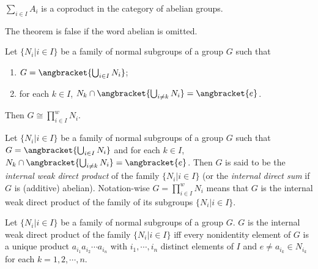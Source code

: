 \begin{theorem}
	$ \sum_{i \in I}A_i $ is a coproduct in the category of abelian groups.
\end{theorem}
The theorem is false if the word abelian is omitted.
\begin{theorem}
	Let $ \{N_i | i\in I \} $ be a family of normal subgroups of a group $ G $ such that
	\begin{enumerate}
		\item $ G=\angbracket{\bigcup_{i \in I}N_i } $;
		\item for each $ k \in I $, $ N_k\cap \angbracket{\bigcup_{i \neq k}N_i} =\angbracket{e}$.
	\end{enumerate}
Then $ G \cong \prod_{i \in I}^{w}N_i $.
\end{theorem}
\begin{definition}
	Let $ \{N_i | i \in I \} $ be a family of normal subgroups of a group $ G $ such that $ G=\angbracket{\bigcup_{i \in I}N_i } $ and for each $ k \in I $, $ N_k\cap \angbracket{\bigcup_{i \neq k}N_i} =\angbracket{e}$. Then $ G $ is said to be the \textit{internal weak direct product} of the family $ \{N_i | i \in I \} $ (or the \textit{internal direct sum} if $ G $ is (additive) abelian). Notation-wise $ G=\prod_{i \in I}^{w}N_i $ means that $ G $ is the internal weak direct product of the family of its subgroups $ \{N_i | i\in I \} $.
\end{definition}
\begin{theorem}
	Let $ \{N_i | i \in I \} $ be a family of normal subgroups of a group $ G $. $ G $ is the internal weak direct product of the family $ \{N_i | i\in I \} $ iff every nonidentity element of $ G $ is a unique product $ a_{i_1}a_{i_2}\cdots a_{i_n} $ with $ i_1,\cdots,i_n $ distinct elements of $ I $ and $ e \neq a_{i_k}\in N_{i_k} $ for each $ k = 1,2,\cdots, n $.
\end{theorem}

